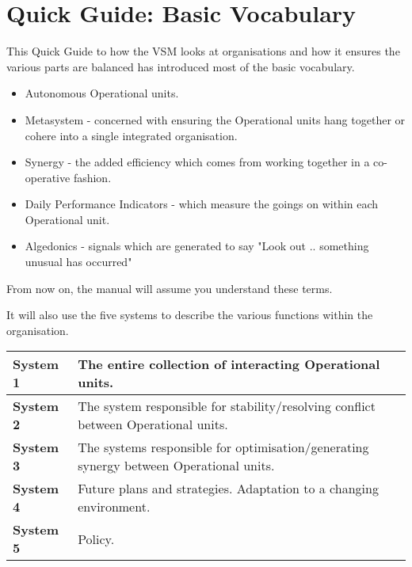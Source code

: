 \section*{Quick Guide: Basic Vocabulary}
This Quick Guide to how the VSM looks at organisations and how it ensures the various parts are balanced has introduced most of the basic vocabulary.

\begin{itemize}
  \item Autonomous Operational units.

  \item Metasystem - concerned with ensuring the Operational units hang together or cohere into a single integrated organisation.

  \item Synergy - the added efficiency which comes from working together in a co-operative fashion.

  \item Daily Performance Indicators - which measure the goings on within each Operational unit.

  \item Algedonics - signals which are generated to say "Look out .. something unusual has occurred"

\end{itemize}

From now on, the manual will assume you understand these terms.

It will also use the five systems to describe the various functions within the organisation.

\begin{table}[H]
    \centering
\begin{tabular}{|C{0.14\textwidth} | L{0.79\textwidth}|}
    \hline
    \textbf{System 1} & The entire collection of interacting Operational units. \\
    \hline
    \textbf{System 2} & The system responsible for stability/resolving conflict between Operational units. \\
    \hline
    \textbf{System 3} & The systems responsible for optimisation/generating synergy between Operational units. \\
    \hline
    \textbf{System 4} & Future plans and strategies. Adaptation to a changing environment. \\
    \hline
    \textbf{System 5} & Policy. \\
    \hline
\end{tabular}
\end{table}